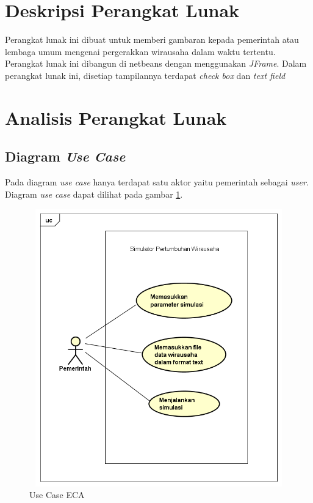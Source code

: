 \section{Deskripsi Perangkat Lunak}
\label{dpl}

Perangkat lunak ini dibuat untuk memberi gambaran kepada pemerintah atau lembaga umum mengenai pergerakkan wirausaha dalam waktu tertentu. Perangkat lunak ini dibangun di netbeans dengan menggunakan \textit{JFrame}. Dalam perangkat lunak ini, disetiap tampilannya terdapat \textit{check box} dan \textit{text field}


\section{Analisis Perangkat Lunak}
\label{analisisPL}

\subsection{Diagram \textit{Use Case}}

Pada diagram \textit{use case} hanya terdapat satu aktor yaitu pemerintah sebagai \textit{user}. Diagram \textit{use case} dapat dilihat pada gambar \ref{fig:usecase}.

	\begin{figure} [H]
		\centering  
		\includegraphics[width=14cm, height=12cm]{UseCase2} 
		\caption[Use Case ECA]{Use Case ECA} 
		\label{fig:usecase} 
	\end{figure}
	
